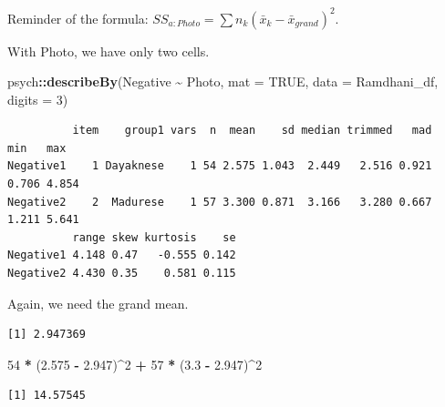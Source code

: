 \documentclass[
  11pt,
]{book}
\newenvironment{Shaded}{\begin{snugshade}}{\end{snugshade}}
\newcommand{\AttributeTok}[1]{\textcolor[rgb]{0.27,0.27,0.27}{#1}}
\newcommand{\ConstantTok}[1]{\textcolor[rgb]{0.37,0.37,0.37}{#1}}
\newcommand{\DecValTok}[1]{\textcolor[rgb]{0.06,0.06,0.06}{#1}}
\newcommand{\FloatTok}[1]{\textcolor[rgb]{0.06,0.06,0.06}{#1}}
\newcommand{\FunctionTok}[1]{\textcolor[rgb]{0.27,0.27,0.27}{\textbf{#1}}}
\newcommand{\NormalTok}[1]{#1}
\newcommand{\SpecialCharTok}[1]{\textcolor[rgb]{0.43,0.43,0.43}{\textbf{#1}}}
\begin{document}
Reminder of the formula: \(SS_{a:Photo}= \sum n_{k}(\bar{x}_{k}-\bar{x}_{grand})^{2}\).

With Photo, we have only two cells.

\begin{Shaded}
\begin{Highlighting}[]
\NormalTok{psych}\SpecialCharTok{::}\FunctionTok{describeBy}\NormalTok{(Negative }\SpecialCharTok{\textasciitilde{}}\NormalTok{ Photo, }\AttributeTok{mat =} \ConstantTok{TRUE}\NormalTok{, }\AttributeTok{data =}\NormalTok{ Ramdhani\_df, }\AttributeTok{digits =} \DecValTok{3}\NormalTok{)}
\end{Highlighting}
\end{Shaded}

\begin{verbatim}
          item    group1 vars  n  mean    sd median trimmed   mad   min   max
Negative1    1 Dayaknese    1 54 2.575 1.043  2.449   2.516 0.921 0.706 4.854
Negative2    2  Madurese    1 57 3.300 0.871  3.166   3.280 0.667 1.211 5.641
          range skew kurtosis    se
Negative1 4.148 0.47   -0.555 0.142
Negative2 4.430 0.35    0.581 0.115
\end{verbatim}

Again, we need the grand mean.

\begin{Shaded}
\end{Shaded}

\begin{verbatim}
[1] 2.947369
\end{verbatim}

\begin{Shaded}
\begin{Highlighting}[]
\DecValTok{54} \SpecialCharTok{*}\NormalTok{ (}\FloatTok{2.575} \SpecialCharTok{{-}} \FloatTok{2.947}\NormalTok{)}\SpecialCharTok{\^{}}\DecValTok{2} \SpecialCharTok{+} \DecValTok{57} \SpecialCharTok{*}\NormalTok{ (}\FloatTok{3.3} \SpecialCharTok{{-}} \FloatTok{2.947}\NormalTok{)}\SpecialCharTok{\^{}}\DecValTok{2}
\end{Highlighting}
\end{Shaded}

\begin{verbatim}
[1] 14.57545
\end{verbatim}
\end{document}
